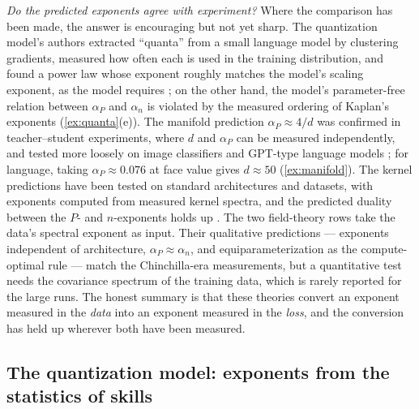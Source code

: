 \documentclass[11pt]{article}
\begin{document}
\emph{Do the predicted exponents agree with experiment?} Where the comparison has been made, the answer is encouraging but not yet sharp. The quantization model's authors extracted ``quanta'' from a small language model by clustering gradients, measured how often each is used in the training distribution, and found a power law whose exponent roughly matches the model's scaling exponent, as the model requires \cite{michaud2023quantization}; on the other hand, the model's parameter-free relation between $\alpha_P$ and $\alpha_n$ is violated by the measured ordering of Kaplan's exponents (\cref{ex:quanta}(e)). The manifold prediction $\alpha_P\approx 4/d$ was confirmed in teacher--student experiments, where $d$ and $\alpha_P$ can be measured independently, and tested more loosely on image classifiers and GPT-type language models \cite{sharma2020neural}; for language, taking $\alpha_P\approx0.076$ at face value gives $d\approx 50$ (\cref{ex:manifold}). The kernel predictions have been tested on standard architectures and datasets, with exponents computed from measured kernel spectra, and the predicted duality between the $P$- and $n$-exponents holds up \cite{bahri2021explaining}. The two field-theory rows take the data's spectral exponent as input. Their qualitative predictions --- exponents independent of architecture, $\alpha_P\approx\alpha_n$, and equiparameterization as the compute-optimal rule --- match the Chinchilla-era measurements, but a quantitative test needs the covariance spectrum of the training data, which is rarely reported for the large runs.
The honest summary is that these theories convert an exponent measured in the \emph{data} into an exponent measured in the \emph{loss}, and the conversion has held up wherever both have been measured.

\subsection{The quantization model: exponents from the statistics of skills}
\label{sec:quanta}
\end{document}
